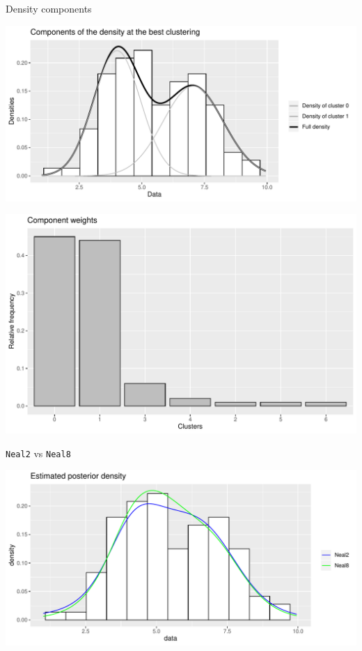 \begin{frame}{Density components}

\begin{center}
		\includegraphics[scale=0.35]{etc/componentsM025m3_best.pdf}
	\end{center}


\begin{center}
		\includegraphics[scale=0.35]{etc/barplotM1m3.pdf}
	\end{center}
\end{frame}



\begin{frame}{\texttt{Neal2} vs \texttt{Neal8}}

\begin{center}
		\includegraphics[scale=0.5]{etc/neal2_M10.pdf}
	\end{center}
	
\end{frame}
